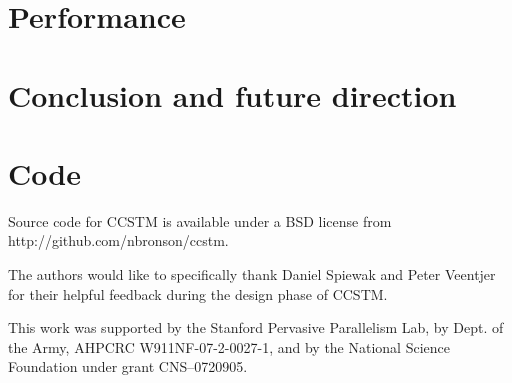 \documentclass[preprint]{sigplanconf}
\begin{document}

%

\section{Performance}
\label{sec:perf}


\section{Conclusion and future direction}
\label{sec:conclusion}


\appendix
\section{Code}

Source code for CCSTM is available under a BSD license from
\textsf{http://github.com/nbronson/ccstm}.


\acks

The authors would like to specifically thank Daniel Spiewak and Peter
Veentjer for their helpful feedback during the design phase of CCSTM.

This work was supported by the Stanford Pervasive Parallelism Lab,
by Dept. of the Army, AHPCRC W911NF-07-2-0027-1, and by
the National Science Foundation under grant CNS--0720905.

{

%


}
\end{document}
